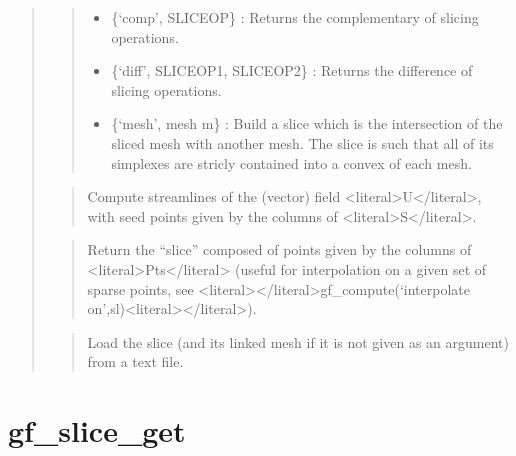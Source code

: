 \documentclass[a4paper,11pt,english]{sphinxmanual}
\begin{document}
\begin{quote}
\begin{quote}
\begin{itemize}
\item {} 
\sphinxAtStartPar
\{‘comp’, SLICEOP\} :
Returns the complementary of slicing operations.

\item {} 
\sphinxAtStartPar
\{‘diff’, SLICEOP1, SLICEOP2\} :
Returns the difference of slicing operations.

\item {} 
\sphinxAtStartPar
\{‘mesh’, mesh m\} :
Build a slice which is the intersection of the sliced mesh with another
mesh. The slice is such that all of its simplexes are stricly contained
into a convex of each mesh.

\end{itemize}
\end{quote}

\sphinxAtStartPar
{}
\begin{quote}

\sphinxAtStartPar
Compute streamlines of the (vector) field \textless{}literal\textgreater{}U\textless{}/literal\textgreater{}, with seed points given
by the columns of \textless{}literal\textgreater{}S\textless{}/literal\textgreater{}.
\end{quote}

\sphinxAtStartPar
{}
\begin{quote}

\sphinxAtStartPar
Return the “slice” composed of points given by the columns of \textless{}literal\textgreater{}Pts\textless{}/literal\textgreater{}
(useful for interpolation on a given set of sparse points, see
\textless{}literal\textgreater{}\textless{}/literal\textgreater{}gf\_compute(‘interpolate on’,sl)\textless{}literal\textgreater{}\textless{}/literal\textgreater{}).
\end{quote}

\sphinxAtStartPar
{}
\begin{quote}

\sphinxAtStartPar
Load the slice (and its linked mesh if it is not given as an argument)
from a text file.
\end{quote}
\end{quote}


\section{gf\_slice\_get}
\label{\detokenize{scilab/cmdref_gf_slice_get:gf-slice-get}}\label{\detokenize{scilab/cmdref_gf_slice_get::doc}}
\sphinxAtStartPar
{}
\end{document}
